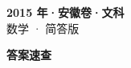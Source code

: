 \documentclass[zihao=-4, a4paper]{ctexart}
\begin{document}
\begin{center}
  {\Large\bfseries 2015 年·安徽卷·文科}\\[4pt]
  {\large 数学 · 简答版}
\end{center}
\medskip
{}

\clearpage
{}
\begin{center}{\Large\bfseries 答案速查}\end{center}
\medskip

\end{document}
